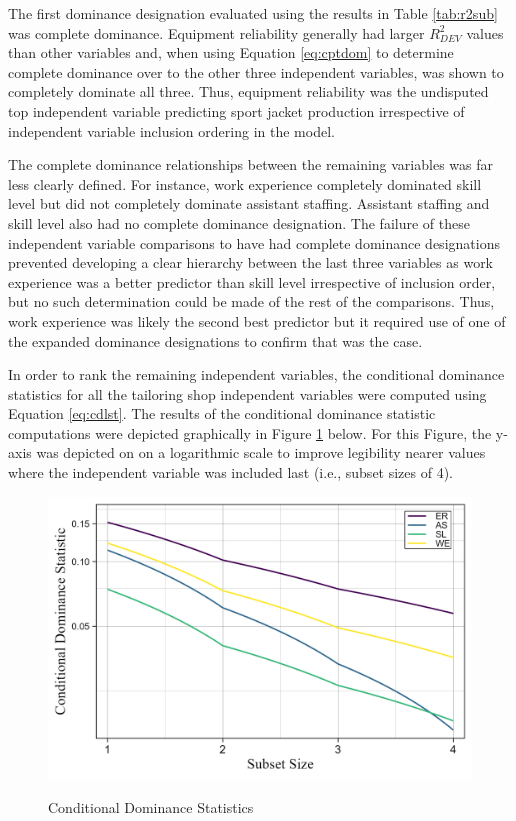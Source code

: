 \documentclass[man]{apa7}
\begin{document}
	
	The first dominance designation evaluated using the results in Table \ref{tab:r2sub} was complete dominance.
	Equipment reliability generally had larger $R^2_{DEV}$ values than other variables and, when using Equation \ref{eq:cptdom} to determine complete dominance over to the other three independent variables, was shown to completely dominate all three.
	Thus, equipment reliability was the undisputed top independent variable predicting sport jacket production irrespective of independent variable inclusion ordering in the model.

	The complete dominance relationships between the remaining variables was far less clearly defined. 
	For instance, work experience completely dominated skill level but did not completely dominate assistant staffing.
	Assistant staffing and skill level also had no complete dominance designation.
	The failure of these independent variable comparisons to have had complete dominance designations prevented developing a clear hierarchy between the last three variables as work experience was a better predictor than skill level irrespective of inclusion order, but no such determination could be made of the rest of the comparisons.
	Thus, work experience was likely the second best predictor but it required use of one of the expanded dominance designations to confirm that was the case.
	
	In order to rank the remaining independent variables, the conditional dominance statistics for all the tailoring shop independent variables were computed using Equation \ref{eq:cdlst}.
	The results of the conditional dominance statistic computations were depicted graphically in Figure \ref{fg:cdl} below.
	For this Figure, the y-axis was depicted on on a logarithmic scale to improve legibility nearer values where the independent variable was included last (i.e., subset sizes of 4).
	
	\begin{figure}[h!]
		\centering
		\caption{\centering Conditional Dominance Statistics}
		\includegraphics{condit_gph}
		\label{fg:cdl}
	\end{figure}
\end{document}
